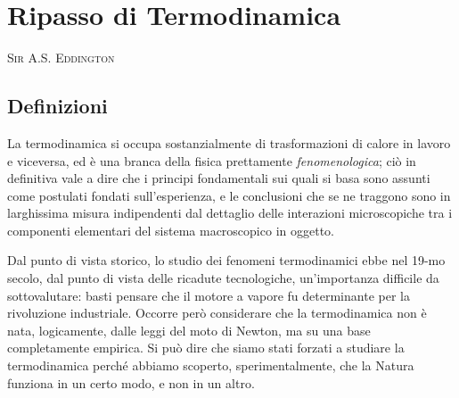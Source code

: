 \chapter{Ripasso di Termodinamica}
\label{cap:termodinamica}

\begin{minipage}{0.35\textwidth}\end{minipage}\hfill
\begin{minipage}{0.65\textwidth}
\vskip 0.25cm
\textsc{Sir A.S. Eddington}
\end{minipage}

\section{Definizioni}
\label{sec1:def}

La termodinamica si occupa sostanzialmente di trasformazioni di calore in lavoro e viceversa, ed è una branca della fisica prettamente {\em fenomenologica}; ciò in definitiva vale a dire che i principi fondamentali sui quali si basa sono assunti come postulati fondati sull'esperienza, e le conclusioni che se ne traggono sono in larghissima misura indipendenti dal dettaglio delle interazioni microscopiche tra i componenti elementari del sistema macroscopico in oggetto.

Dal punto di vista storico, lo studio dei fenomeni termodinamici ebbe nel 19-mo secolo, dal punto di vista delle ricadute tecnologiche, un'importanza difficile da sottovalutare: basti pensare che il motore a vapore fu determinante per la rivoluzione industriale. Occorre però considerare che la termodinamica non è nata, logicamente, dalle leggi del moto di Newton, ma su una base completamente empirica. Si può dire che siamo stati forzati a studiare la termodinamica perché abbiamo scoperto, sperimentalmente, che la Natura funziona in un certo modo, e non in un altro.

